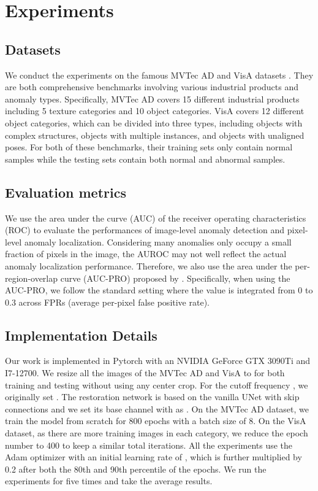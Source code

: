 \documentclass[5p, twocolumn]{elsarticle}[draft]
\begin{document}
\section{Experiments}
\subsection{Datasets}
\label{4.1}
We conduct the experiments on the famous MVTec AD \cite{bergmann2019mvtec} and VisA datasets \cite{zou2022spot}. They are both comprehensive benchmarks involving various industrial products and anomaly types. Specifically, MVTec AD covers 15 different industrial products including 5 texture categories and 10 object categories. VisA covers 12 different object categories, which can be divided into three types, including objects with complex structures, objects with multiple instances, and objects with unaligned poses. For both of these benchmarks, their training sets only contain normal samples while the testing sets contain both normal and abnormal samples.

\subsection{Evaluation metrics}
We use the area under the curve (AUC) of the receiver operating characteristics (ROC) to evaluate the performances of image-level anomaly detection and pixel-level anomaly localization. Considering many anomalies only occupy a small fraction of pixels in the image, the AUROC may not well reflect the actual anomaly localization performance. Therefore, we also use the area under the per-region-overlap curve (AUC-PRO) proposed by \cite{bergmann2020uninformed}. Specifically, when using the AUC-PRO, we follow the standard setting where the value is integrated from 0 to 0.3 across FPRs (average per-pixel false positive rate). 

\subsection{Implementation Details}
Our work is implemented in Pytorch with an NVIDIA GeForce GTX 3090Ti and I7-12700. We resize all the images of the MVTec AD and VisA to  for both training and testing without using any center crop. For the cutoff frequency , we originally set . The restoration network is based on the vanilla UNet with skip connections and we set its base channel with  as . On the MVTec AD dataset, we train the model from scratch for 800 epochs with a batch size of 8. On the VisA dataset, as there are more training images in each category, we reduce the epoch number to 400 to keep a similar total iterations. All the experiments use the Adam optimizer with an initial learning rate of , which is further multiplied by 0.2 after both the 80th and 90th percentile of the epochs. We run the experiments for five times and take the average results.
\end{document}
